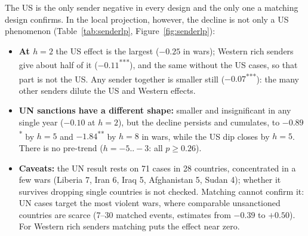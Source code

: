 \documentclass[11pt,a4paper]{article}
\newcommand{\sig}[1]{\textsuperscript{#1}}
\begin{document}
The US is the only sender negative in every design and the only one a matching design confirms. In the local
projection, however, the decline is not only a US phenomenon (Table~\ref{tab:senderlp}, Figure~\ref{fig:senderlp}):
\begin{itemize}[leftmargin=*]
\item \textbf{At $h=2$} the US effect is the largest ($-0.25$ in wars); Western rich senders give about half of it
  ($-0.11$\sig{***}), and the same without the US cases, so that part is not the US. Any sender together is smaller
  still ($-0.07$\sig{***}): the many other senders dilute the US and Western effects.
\item \textbf{UN sanctions have a different shape:} smaller and insignificant in any single year ($-0.10$ at $h=2$), but
  the decline persists and cumulates, to $-0.89$\sig{*} by $h=5$ and $-1.84$\sig{**} by $h=8$ in wars, while the US dip
  closes by $h=5$. There is no pre-trend ($h=-5..-3$: all $p\ge0.26$).
\item \textbf{Caveats:} the UN result rests on 71 cases in 28 countries, concentrated in a few wars (Liberia 7, Iran 6,
  Iraq 5, Afghanistan 5, Sudan 4); whether it survives dropping single countries is not checked. Matching cannot
  confirm it: UN cases target the most violent wars, where comparable unsanctioned countries are scarce (7--30 matched
  events, estimates from $-0.39$ to $+0.50$). For Western rich senders matching puts the effect near zero.
\end{itemize}
\end{document}
